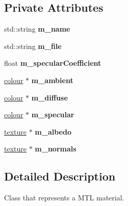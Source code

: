 \subsection*{Private Attributes}
\begin{DoxyCompactItemize}
\item 
\mbox{\label{classflounder_1_1material_a5e59069daead88bf61895c118e393cbe}} 
std\+::string {\bfseries m\+\_\+name}
\item 
\mbox{\label{classflounder_1_1material_a31e333d7092514112cf023303642faee}} 
std\+::string {\bfseries m\+\_\+file}
\item 
\mbox{\label{classflounder_1_1material_adb0188004c5e4f4530611c9a342ed355}} 
float {\bfseries m\+\_\+specular\+Coefficient}
\item 
\mbox{\label{classflounder_1_1material_aca7142ea9c1e71da9fe457b0ce5b5ab8}} 
\hyperlink{classflounder_1_1colour}{colour} $\ast$ {\bfseries m\+\_\+ambient}
\item 
\mbox{\label{classflounder_1_1material_a3e562b66887afa2f5f0cbe0392d7bdbd}} 
\hyperlink{classflounder_1_1colour}{colour} $\ast$ {\bfseries m\+\_\+diffuse}
\item 
\mbox{\label{classflounder_1_1material_a37e9779779935f4da2264384e131b560}} 
\hyperlink{classflounder_1_1colour}{colour} $\ast$ {\bfseries m\+\_\+specular}
\item 
\mbox{\label{classflounder_1_1material_a9052a0f685caf16d2ac374cf556e6441}} 
\hyperlink{classflounder_1_1texture}{texture} $\ast$ {\bfseries m\+\_\+albedo}
\item 
\mbox{\label{classflounder_1_1material_a80be93273c968b0eac1e867d3c219d43}} 
\hyperlink{classflounder_1_1texture}{texture} $\ast$ {\bfseries m\+\_\+normals}
\end{DoxyCompactItemize}


\subsection{Detailed Description}
Class that represents a M\+TL material. 



